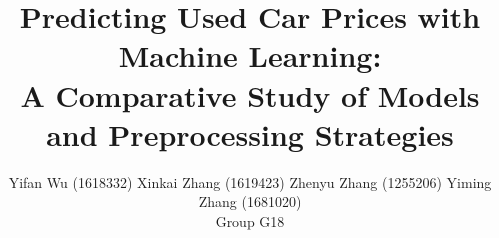 \documentclass[11pt]{article}
\title{Predicting Used Car Prices with Machine Learning:\\
       A Comparative Study of Models and Preprocessing Strategies}
\author{
  Yifan Wu (1618332) \quad Xinkai Zhang (1619423) \quad Zhenyu Zhang (1255206) \quad Yiming Zhang (1681020)\\
  Group G18
}
\begin{document}
\maketitle

\begin{abstract}

\end{abstract}









\end{document}
